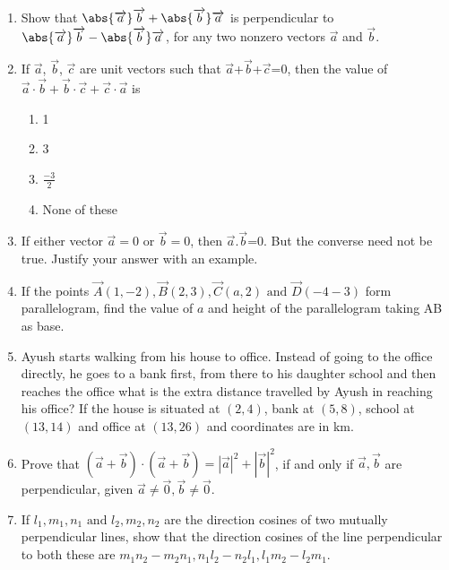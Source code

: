\begin{enumerate}[label=\thesubsection.\arabic*,ref=\thesubsection.\theenumi]
	\solution
		
\item Show that $\abs {\overrightarrow {a}}\overrightarrow {b}+\abs{\overrightarrow {b}}\overrightarrow {a}$ is perpendicular to $\abs{\overrightarrow {a}} \overrightarrow {b}-\abs{\overrightarrow {b}} \overrightarrow {a}$, for any two nonzero vectors $\overrightarrow {a}$ and $\overrightarrow {b}$.
	\\
	\solution
		
\item If $\vec{a}$, $\vec{b}$, $\vec{c}$ are unit vectors such that $\vec{a}$+$\vec{b}$+$\vec{c}$=0, then the value of $\vec{a} \cdot \vec{b}+\vec{b} \cdot \vec{c}+\vec{c} \cdot \vec{a}$ is
	\begin{enumerate}
\item 1
\item 3
\item $\frac{-3}{2}$
\item None of these
\end{enumerate}
	\solution
		
\item If either vector $\overrightarrow {a}=0$ or $\overrightarrow {b}=0$, then $\overrightarrow {a}.\overrightarrow {b}$=0. But the converse need not be true. Justify your answer with an example.
	\\
	\solution
		
\item If the points  $\vec{A}(1,-2), \vec{B}(2,3) , \vec{C}(a,2)\text{ and }\vec{D} (-4-3)$ form parallelogram, find the value of $a$ and height of the parallelogram taking AB as base.
\item Ayush starts walking from his house to office. Instead of going to the office directly, he goes to a bank first, from there to his daughter school and then reaches the office what is the extra distance travelled by Ayush in reaching his office? If the house is situated at $(2,4)$, bank at $(5,8)$, school at $(13,14)$ and office at $(13,26)$ and coordinates are in km.
\item Prove that $(\vec{a}+\vec{b})\cdot(\vec{a}+\vec{b})=|{\vec{a}}|^2+|{\vec{b}}|^2$, if and only if $\vec{a}, \vec{b}$ are perpendicular, given $\vec{a}\neq\vec{0}, \vec{b}\neq\vec{0}$.\\
	\solution
		
	\item  If $l_1, m_1,n_1 \text{ and } l_2,m_2,n_2$ are the direction cosines of two mutually perpendicular lines, show that the direction cosines of the line perpendicular to both these are  $m_1n_2-m_2n_1,n_1l_2-n_2l_1,l_1m_2-l_2m_1$.

\end{enumerate}
